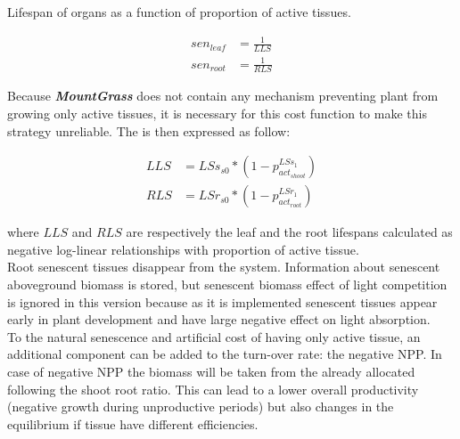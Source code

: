 \documentclass[a4paper,twoside, justified,marginals=raggedright, nobib]{tufte-handout}
\newcommand{\model}{\textit{\textbf{MountGrass }}}
\begin{document}
\begin{marginfigure}
\label{fig:lifespan}
\caption{Lifespan of organs as a function of proportion of active tissues.}
\end{marginfigure}

\begin{align}
sen_{leaf} &= \frac{1}{LLS}\\
sen_{root} &= \frac{1}{RLS}
\end{align}

Because \model does not contain any mechanism preventing plant from growing only  active tissues, it is necessary for this cost function to make this strategy unreliable. The is then expressed as follow:

\begin{align}
LLS &= LSs_{s0} * (1- p_{act_{shoot}}^{LSs_{1}}) \\
RLS &= LSr_{s0} * (1- p_{act_{root}}^{LSr_{1}})
\end{align}


where $LLS$ and $RLS$ are respectively the leaf and the root lifespans calculated as negative log-linear relationships with proportion of active tissue.\\
\indent Root senescent tissues disappear from the system. Information about senescent aboveground biomass is stored, but senescent biomass effect of light competition is ignored in this version because as it is implemented senescent tissues appear early in plant development and have large negative effect on light absorption.\\
\indent To the natural senescence and artificial cost of having only active tissue, an additional component can be added to the turn-over rate: the negative NPP. In case of negative NPP the biomass will be taken from the already allocated following the shoot root ratio. This can lead to a lower overall productivity (negative growth during unproductive periods) but also changes in the equilibrium if tissue have different efficiencies.\\
\end{document}
